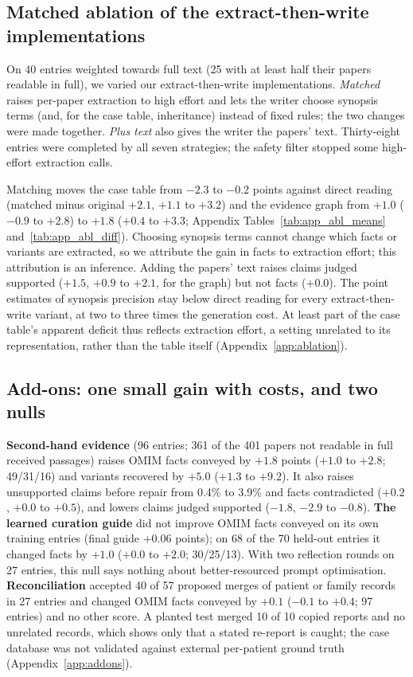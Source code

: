 \documentclass{article} %
\begin{document}
\subsection{Matched ablation of the extract-then-write implementations}
\label{sec:ablation}
On 40 entries weighted towards full text (25 with at least half their papers readable in full), we varied our extract-then-write implementations. \emph{Matched} raises per-paper extraction to high effort and lets the writer choose synopsis terms (and, for the case table, inheritance) instead of fixed rules; the two changes were made together. \emph{Plus text} also gives the writer the papers' text. Thirty-eight entries were completed by all seven strategies; the safety filter stopped some high-effort extraction calls.

Matching moves the case table from $-2.3$ to $-0.2$ points against direct reading (matched minus original $+2.1$, $+1.1$ to $+3.2$) and the evidence graph from $+1.0$ ($-0.9$ to $+2.8$) to $+1.8$ ($+0.4$ to $+3.3$; Appendix Tables~\ref{tab:app_abl_means} and~\ref{tab:app_abl_diff}). Choosing synopsis terms cannot change which facts or variants are extracted, so we attribute the gain in facts to extraction effort; this attribution is an inference. Adding the papers' text raises claims judged supported ($+1.5$, $+0.9$ to $+2.1$, for the graph) but not facts ($+0.0$). The point estimates of synopsis precision stay below direct reading for every extract-then-write variant, at two to three times the generation cost. At least part of the case table's apparent deficit thus reflects extraction effort, a setting unrelated to its representation, rather than the table itself (Appendix~\ref{app:ablation}).

\subsection{Add-ons: one small gain with costs, and two nulls}
\label{sec:addons}
\textbf{Second-hand evidence} (96 entries; 361 of the 401 papers not readable in full received passages) raises OMIM facts conveyed by $+1.8$ points ($+1.0$ to $+2.8$; 49/31/16) and variants recovered by $+5.0$ ($+1.3$ to $+9.2$). It also raises unsupported claims before repair from 0.4\% to 3.9\% and facts contradicted ($+0.2$, $+0.0$ to $+0.5$), and lowers claims judged supported ($-1.8$, $-2.9$ to $-0.8$). \textbf{The learned curation guide} did not improve OMIM facts conveyed on its own training entries (final guide $+0.06$ points); on 68 of the 70 held-out entries it changed facts by $+1.0$ ($+0.0$ to $+2.0$; 30/25/13). With two reflection rounds on 27 entries, this null says nothing about better-resourced prompt optimisation. \textbf{Reconciliation} accepted 40 of 57 proposed merges of patient or family records in 27 entries and changed OMIM facts conveyed by $+0.1$ ($-0.1$ to $+0.4$; 97 entries) and no other score. A planted test merged 10 of 10 copied reports and no unrelated records, which shows only that a stated re-report is caught; the case database was not validated against external per-patient ground truth (Appendix~\ref{app:addons}).
\end{document}
